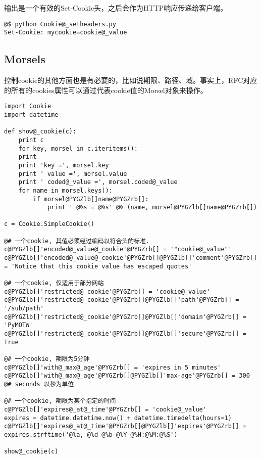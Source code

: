 \documentclass[a4paper,10pt,english]{manual}
\begin{document}
输出是一个有效的Set-Cookie头，之后会作为HTTP响应传递给客户端。

\begin{Verbatim}[commandchars=@\[\]]
@$ python Cookie@_setheaders.py
Set-Cookie: mycookie=cookie@_value
\end{Verbatim}


\subsection{Morsels}

控制cookie的其他方面也是有必要的，比如说期限、路径、域。事实上，RFC对应的所有的cookies属性可以通过代表cookie值的Morsel对象来操作。

\begin{Verbatim}[commandchars=@\[\]]
import Cookie
import datetime

def show@_cookie(c):
    print c
    for key, morsel in c.iteritems():
    print
    print 'key =', morsel.key
    print ' value =', morsel.value
    print ' coded@_value =', morsel.coded@_value
    for name in morsel.keys():
        if morsel@PYGZlb[]name@PYGZrb[]:
            print ' @%s = @%s' @% (name, morsel@PYGZlb[]name@PYGZrb[])

c = Cookie.SimpleCookie()

@# 一个cookie, 其值必须经过编码以符合头的标准.
c@PYGZlb[]'encoded@_value@_cookie'@PYGZrb[] = '"cookie@_value"'
c@PYGZlb[]'encoded@_value@_cookie'@PYGZrb[]@PYGZlb[]'comment'@PYGZrb[] = 'Notice that this cookie value has escaped quotes'

@# 一个cookie, 仅适用于部分网站
c@PYGZlb[]'restricted@_cookie'@PYGZrb[] = 'cookie@_value'
c@PYGZlb[]'restricted@_cookie'@PYGZrb[]@PYGZlb[]'path'@PYGZrb[] = '/sub/path'
c@PYGZlb[]'restricted@_cookie'@PYGZrb[]@PYGZlb[]'domain'@PYGZrb[] = 'PyMOTW'
c@PYGZlb[]'restricted@_cookie'@PYGZrb[]@PYGZlb[]'secure'@PYGZrb[] = True

@# 一个cookie, 期限为5分钟
c@PYGZlb[]'with@_max@_age'@PYGZrb[] = 'expires in 5 minutes'
c@PYGZlb[]'with@_max@_age'@PYGZrb[]@PYGZlb[]'max-age'@PYGZrb[] = 300 @# seconds 以秒为单位

@# 一个cookie, 期限为某个指定的时间
c@PYGZlb[]'expires@_at@_time'@PYGZrb[] = 'cookie@_value'
expires = datetime.datetime.now() + datetime.timedelta(hours=1)
c@PYGZlb[]'expires@_at@_time'@PYGZrb[]@PYGZlb[]'expires'@PYGZrb[] = expires.strftime('@%a, @%d @%b @%Y @%H:@%M:@%S')

show@_cookie(c)
\end{Verbatim}
\end{document}
